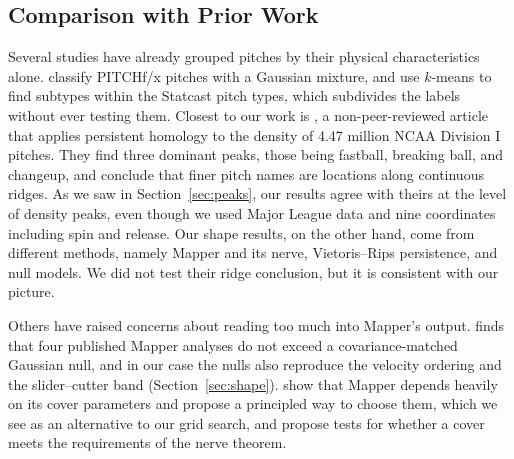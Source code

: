 \documentclass[11pt]{article}
\theoremstyle{definition}
\theoremstyle{remark}
\begin{document}
\subsection{Comparison with Prior Work}\label{sec:prior}
Several studies have already grouped pitches by their physical characteristics alone.
\textcite{pane2013trouble} classify PITCHf/x pitches with a Gaussian mixture, and \textcite{camp2020clustering} use $k$-means to find subtypes within the Statcast pitch types, which subdivides the labels without ever testing them.
Closest to our work is \textcite{maloof2026classify}, a non-peer-reviewed article that applies persistent homology to the density of 4.47 million NCAA Division I pitches.
They find three dominant peaks, those being fastball, breaking ball, and changeup, and conclude that finer pitch names are locations along continuous ridges.
As we saw in Section~\ref{sec:peaks}, our results agree with theirs at the level of density peaks, even though we used Major League data and nine coordinates including spin and release.
Our shape results, on the other hand, come from different methods, namely Mapper and its nerve, Vietoris--Rips persistence, and null models.
We did not test their ridge conclusion, but it is consistent with our picture.

Others have raised concerns about reading too much into Mapper's output.
\textcite{topaz2026null} finds that four published Mapper analyses do not exceed a covariance-matched Gaussian null, and in our case the nulls also reproduce the velocity ordering and the slider--cutter band (Section~\ref{sec:shape}).
\textcite{carrieremicheloudot2018} show that Mapper depends heavily on its cover parameters and propose a principled way to choose them, which we see as an alternative to our grid search, and \textcite{vejdemojohansson2018certified} propose tests for whether a cover meets the requirements of the nerve theorem.
\end{document}
